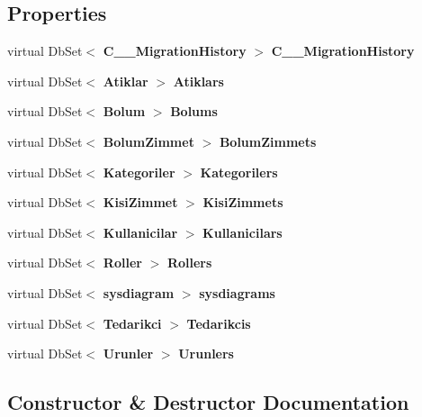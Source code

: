 \subsection*{Properties}
\begin{DoxyCompactItemize}
\item 
virtual Db\+Set$<$ \textbf{ C\+\_\+\+\_\+\+Migration\+History} $>$ \textbf{ C\+\_\+\+\_\+\+Migration\+History}\hspace{0.3cm}{\ttfamily  [get, set]}
\item 
virtual Db\+Set$<$ \textbf{ Atiklar} $>$ \textbf{ Atiklars}\hspace{0.3cm}{\ttfamily  [get, set]}
\item 
virtual Db\+Set$<$ \textbf{ Bolum} $>$ \textbf{ Bolums}\hspace{0.3cm}{\ttfamily  [get, set]}
\item 
virtual Db\+Set$<$ \textbf{ Bolum\+Zimmet} $>$ \textbf{ Bolum\+Zimmets}\hspace{0.3cm}{\ttfamily  [get, set]}
\item 
virtual Db\+Set$<$ \textbf{ Kategoriler} $>$ \textbf{ Kategorilers}\hspace{0.3cm}{\ttfamily  [get, set]}
\item 
virtual Db\+Set$<$ \textbf{ Kisi\+Zimmet} $>$ \textbf{ Kisi\+Zimmets}\hspace{0.3cm}{\ttfamily  [get, set]}
\item 
virtual Db\+Set$<$ \textbf{ Kullanicilar} $>$ \textbf{ Kullanicilars}\hspace{0.3cm}{\ttfamily  [get, set]}
\item 
virtual Db\+Set$<$ \textbf{ Roller} $>$ \textbf{ Rollers}\hspace{0.3cm}{\ttfamily  [get, set]}
\item 
virtual Db\+Set$<$ \textbf{ sysdiagram} $>$ \textbf{ sysdiagrams}\hspace{0.3cm}{\ttfamily  [get, set]}
\item 
virtual Db\+Set$<$ \textbf{ Tedarikci} $>$ \textbf{ Tedarikcis}\hspace{0.3cm}{\ttfamily  [get, set]}
\item 
virtual Db\+Set$<$ \textbf{ Urunler} $>$ \textbf{ Urunlers}\hspace{0.3cm}{\ttfamily  [get, set]}
\end{DoxyCompactItemize}


\subsection{Constructor \& Destructor Documentation}
\mbox{\label{class_stok_otomasyanu_1_1_stok_takip_context_afa38fd05508651acdb198363e8f825b4}} 
